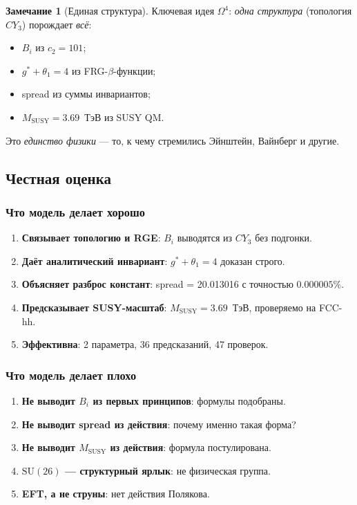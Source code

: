 \documentclass[11pt,a4paper]{article}
\newcommand{\SU}{\ensuremath{\mathrm{SU}}}
\newcommand{\CY}{\ensuremath{CY_3}}
\newcommand{\Om}{\ensuremath{\Omega^4}}
\theoremstyle{definition}
\newtheorem{remark}[theorem]{Замечание}
\begin{document}
\begin{remark}[Единая структура]
\label{rem:unity}
Ключевая идея $\Om$: \emph{одна структура} (топология $\CY$)
порождает \emph{всё}:
\begin{itemize}
    \item $B_i$ из $c_2 = 101$;
    \item $g^* + \theta_1 = 4$ из FRG-$\beta$-функции;
    \item spread из суммы инвариантов;
    \item $M_{\text{SUSY}} = 3.69$~ТэВ из SUSY QM.
\end{itemize}
Это \emph{единство физики} --- то, к чему стремились
Эйнштейн, Вайнберг и другие.
\end{remark}

\subsection{Честная оценка}
\label{subsec:disc-honest}

\subsubsection{Что модель делает хорошо}

\begin{enumerate}
    \item \textbf{Связывает топологию и RGE}: $B_i$ выводятся
          из $\CY$ без подгонки.
    \item \textbf{Даёт аналитический инвариант}:
          $g^* + \theta_1 = 4$ доказан строго.
    \item \textbf{Объясняет разброс констант}: spread = 20.013016
          с точностью $0.000005\%$.
    \item \textbf{Предсказывает SUSY-масштаб}:
          $M_{\text{SUSY}} = 3.69$~ТэВ, проверяемо на FCC-hh.
    \item \textbf{Эффективна}: 2 параметра, 36 предсказаний,
          47 проверок.
\end{enumerate}

\subsubsection{Что модель делает плохо}

\begin{enumerate}
    \item \textbf{Не выводит $B_i$ из первых принципов}:
          формулы подобраны.
    \item \textbf{Не выводит spread из действия}:
          почему именно такая форма?
    \item \textbf{Не выводит $M_{\text{SUSY}}$ из действия}:
          формула постулирована.
    \item \textbf{$\SU(26)$ --- структурный ярлык}:
          не физическая группа.
    \item \textbf{EFT, а не струны}: нет действия Полякова.
\end{enumerate}
\end{document}

